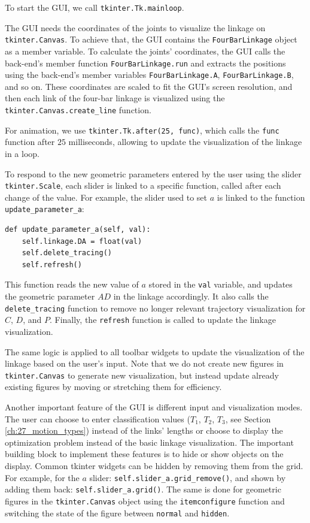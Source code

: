 \documentclass{article}
\begin{document}
To start the GUI, we call \texttt{tkinter.Tk.mainloop}.

The GUI needs the coordinates of the joints to visualize the linkage on \texttt{tkinter.Canvas}. To achieve that, the GUI contains the \texttt{FourBarLinkage} object as a member variable. To calculate the joints' coordinates, the GUI calls the back-end's member function \texttt{FourBarLinkage.run} and extracts the positions using the back-end's member variables \texttt{FourBarLinkage.A}, \texttt{FourBarLinkage.B}, and so on. These coordinates are scaled to fit the GUI's screen resolution, and then each link of the four-bar linkage is visualized using the \texttt{tkinter.Canvas.create\_line} function.

For animation, we use \texttt{tkinter.Tk.after(25, func)}, which calls the \texttt{func} function after $25$ milliseconds, allowing to update the visualization of the linkage in a loop.

To respond to the new geometric parameters entered by the user using the slider \texttt{tkinter.Scale}, each slider is linked to a specific function, called after each change of the value. For example, the slider used to set $a$ is linked to the function \texttt{update\_parameter\_a}: 

\begin{lstlisting}
def update_parameter_a(self, val):
	self.linkage.DA = float(val)
	self.delete_tracing()
	self.refresh()
\end{lstlisting}

This function reads the new value of $a$ stored in the \texttt{val} variable, and updates the geometric parameter $AD$ in the linkage accordingly. It also calls the \texttt{delete\_tracing} function to remove no longer relevant trajectory visualization for $C$, $D$, and $P$. Finally, the \texttt{refresh} function is called to update the linkage visualization.

The same logic is applied to all toolbar widgets to update the visualization of the linkage based on the user's input. Note that we do not create new figures in \texttt{tkinter.Canvas} to generate new visualization, but instead update already existing figures by moving or stretching them for efficiency.

Another important feature of the GUI is different input and visualization modes. The user can choose to enter classification values ($T_1$, $T_2$, $T_3$, see Section \ref{ch:27_motion_types}) instead of the links' lengths or choose to display the optimization problem instead of the basic linkage visualization. The important building block to implement these features is to hide or show objects on the display. Common tkinter widgets can be hidden by removing them from the grid. For example, for the $a$ slider: \lstinline|self.slider_a.grid_remove()|, and shown by adding them back: \lstinline|self.slider_a.grid()|. The same is done for geometric figures in the \texttt{tkinter.Canvas} object using the \texttt{itemconfigure} function and switching the state of the figure between \texttt{normal} and \texttt{hidden}.
\end{document}

